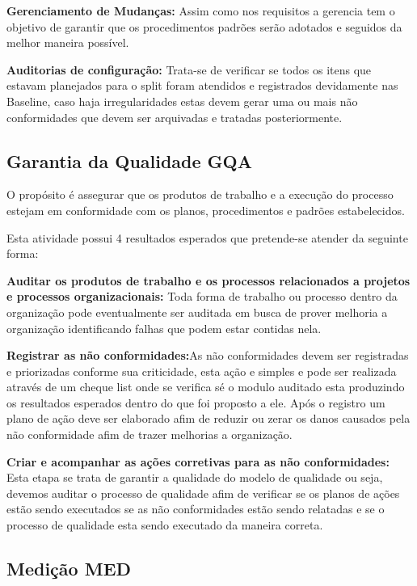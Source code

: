 \documentclass[	DIV=calc,%
							paper=a4,%
							fontsize=12pt,%
							onecolumn]{scrartcl}	 					%
\begin{document}
{\textbf{Gerenciamento de Mudanças:}} Assim como nos requisitos a gerencia tem o objetivo de garantir que os procedimentos padrões serão adotados e seguidos da melhor maneira possível.


{\textbf{Auditorias de configuração:}} Trata-se de verificar se todos os itens que estavam planejados para o split foram atendidos e registrados devidamente nas Baseline, caso haja irregularidades estas devem gerar uma ou mais não conformidades que devem ser arquivadas e tratadas posteriormente.

\subsection{Garantia da Qualidade GQA}

O propósito é assegurar que os produtos de trabalho e a execução do processo estejam em conformidade com os planos, procedimentos e padrões estabelecidos.


Esta atividade possui 4 resultados esperados que pretende-se atender da seguinte forma:


{\textbf{Auditar os produtos de trabalho e os processos relacionados a projetos e processos organizacionais:}} Toda forma de trabalho ou processo dentro da organização pode eventualmente ser auditada em busca de prover melhoria a organização identificando falhas que podem estar contidas nela.



{\textbf{Registrar as não conformidades:}}As não conformidades devem ser registradas e priorizadas conforme sua criticidade, esta ação e simples e pode ser realizada através de um cheque list onde se verifica sé o modulo auditado esta produzindo os resultados esperados dentro do que foi proposto a ele. 
Após o registro um plano de ação deve ser elaborado afim de reduzir ou zerar os danos causados pela não conformidade afim de trazer melhorias a organização. 



{\textbf{Criar e acompanhar as ações corretivas para as não conformidades:}} Esta etapa se trata de garantir a qualidade do modelo de qualidade ou seja, devemos auditar o processo de qualidade afim de verificar se os planos de ações estão sendo executados se as não conformidades estão sendo relatadas e se o processo de qualidade esta sendo executado da maneira correta.


\subsection{Medição MED}
\end{document}
